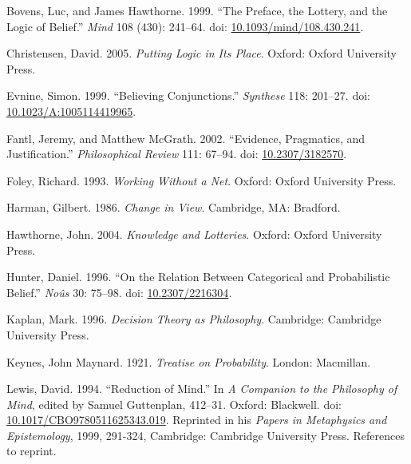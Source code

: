 \documentclass[
  11pt,
  letterpaper,
  DIV=11,
  numbers=noendperiod,
  twoside]{scrartcl}
\newlength{\cslhangindent}
\newenvironment{CSLReferences}[2] %
 {\begin{list}{}{%
  \setlength{\itemindent}{0pt}
  \setlength{\leftmargin}{0pt}
  \setlength{\parsep}{0pt}
  \ifodd #1
   \setlength{\leftmargin}{\cslhangindent}
   \setlength{\itemindent}{-1\cslhangindent}
  \fi
  \setlength{\itemsep}{#2\baselineskip}}}
 {\end{list}}
\begin{document}
\label{refs}
\begin{CSLReferences}{1}{0}
Bovens, Luc, and James Hawthorne. 1999. {``The Preface, the Lottery, and
the Logic of Belief.''} \emph{Mind} 108 (430): 241--64. doi:
\href{https://doi.org/10.1093/mind/108.430.241}{10.1093/mind/108.430.241}.

Christensen, David. 2005. \emph{Putting Logic in Its Place}. Oxford:
Oxford University Press.

Evnine, Simon. 1999. {``Believing Conjunctions.''} \emph{Synthese} 118:
201--27. doi:
\href{https://doi.org/10.1023/A:1005114419965}{10.1023/A:1005114419965}.

Fantl, Jeremy, and Matthew McGrath. 2002. {``Evidence, Pragmatics, and
Justification.''} \emph{Philosophical Review} 111: 67--94. doi:
\href{https://doi.org/10.2307/3182570}{10.2307/3182570}.

Foley, Richard. 1993. \emph{Working Without a Net}. Oxford: Oxford
University Press.

Harman, Gilbert. 1986. \emph{Change in View}. Cambridge, MA: Bradford.

Hawthorne, John. 2004. \emph{Knowledge and Lotteries}. Oxford: Oxford
University Press.

Hunter, Daniel. 1996. {``On the Relation Between Categorical and
Probabilistic Belief.''} \emph{No{û}s} 30: 75--98. doi:
\href{https://doi.org/10.2307/2216304}{10.2307/2216304}.

Kaplan, Mark. 1996. \emph{Decision Theory as Philosophy}. Cambridge:
Cambridge University Press.

Keynes, John Maynard. 1921. \emph{Treatise on Probability}. London:
Macmillan.

Lewis, David. 1994. {``Reduction of Mind.''} In \emph{A Companion to the
Philosophy of Mind}, edited by Samuel Guttenplan, 412--31. Oxford:
Blackwell. doi:
\href{https://doi.org/10.1017/CBO9780511625343.019}{10.1017/CBO9780511625343.019}.
Reprinted in his \emph{Papers in Metaphysics and Epistemology}, 1999,
291-324, Cambridge: Cambridge University Press. References to reprint.


\end{CSLReferences}
\end{document}
